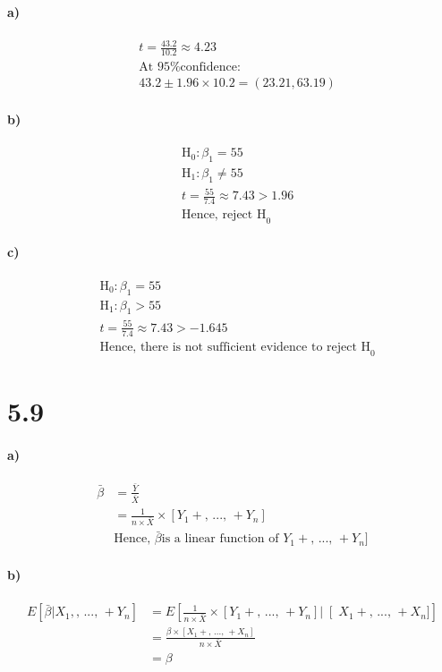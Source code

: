 \documentclass[letterpaper,12pt,titlepage,oneside,final]{book}
\begin{document}
\paragraph{a)}
\begin{align*}
&t = \frac{43.2}{10.2} \approx 4.23 \\
&\text{At 95\% confidence:}\\
&43.2\pm 1.96 \times 10.2 = (23.21, 63.19)
\end{align*}
\paragraph{b)}
\begin{align*}
&\text{H}_0 : \beta_1 = 55\\
&\text{H}_1 : \beta_1 \neq 55\\
&t = \frac{55}{7.4} \approx 7.43 > 1.96\\
&\text{Hence, reject H}_0
\end{align*}
\paragraph{c)}
\begin{align*}
&\text{H}_0 : \beta_1 = 55\\
&\text{H}_1 : \beta_1 > 55\\
&t = \frac{55}{7.4} \approx 7.43 > -1.645\\
&\text{Hence, there is not sufficient evidence to reject H}_0
\end{align*}

\section*{5.9}
\paragraph{a)}
\begin{align*}
\bar{\beta} &= \frac{\bar{Y}}{\bar{X}}\\
&=\frac{1}{n \times \bar{X}} \times [Y_1 + \text{, ..., }+ Y_n]\\
&\text{Hence, }\bar{\beta}\text{is a linear function of }Y_1 + \text{, ..., }+ Y_n]
\end{align*}
\paragraph{b)}
\begin{align*}
E[\bar{\beta} | X_1, \text{, ..., }+ Y_n ] &= E\left[\frac{1}{n \times \bar{X}} \times [Y_1 + \text{, ..., }+ Y_n] \left|\right [X_1 + \text{, ..., }+ X_n ] \right]\\
& = \frac{\beta \times [X_1 + \text{, ..., }+ X_n ]}{n \times \bar{X}} \\
&=\beta
\end{align*}
\end{document}
